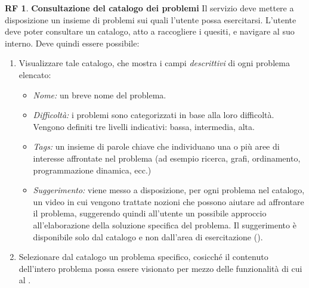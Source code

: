 \documentclass[11pt, a4paper]{article}
\theoremstyle{definition}
\newtheorem{funcreq}{RF} %
\begin{document}
\begin{funcreq}
\label{probcatalogue}
\textbf{Consultazione del catalogo dei problemi }
Il servizio deve mettere a disposizione un insieme di problemi sui quali
l'utente possa esercitarsi. L'utente deve poter consultare un catalogo,
atto a raccogliere i quesiti, e navigare al suo interno. Deve quindi
essere possibile:
\begin{enumerate}
    \item Visualizzare tale catalogo, che mostra i campi \textit{descrittivi}
    di ogni problema elencato:
    \begin{itemize}
        \item \textit{Nome:} un breve nome del problema.

        \item \textit{Difficoltà:} i problemi sono categorizzati in base alla
        loro difficoltà. Vengono definiti tre livelli indicativi:
        bassa, intermedia, alta.
        
        \item \textit{Tags:} un insieme di parole chiave che individuano una
        o più aree di interesse affrontate nel problema (ad esempio ricerca,
        grafi, ordinamento, programmazione dinamica, ecc.)

        \item \textit{Suggerimento:} viene messo a disposizione, per ogni
        problema nel catalogo, un video in cui vengono trattate nozioni che
        possono aiutare ad affrontare il problema, suggerendo quindi all'utente un
        possibile approccio all'elaborazione della soluzione specifica del
        problema. Il suggerimento è disponibile solo dal catalogo e non
        dall'area di esercitazione (\textcolor{blue}{}).
    \end{itemize}

    \item Selezionare dal catalogo un problema specifico, cosicché
    il contenuto dell'intero problema possa essere visionato per mezzo
    delle funzionalità di cui al \textcolor{blue}{}.
\end{enumerate}
\end{funcreq}
\end{document}
